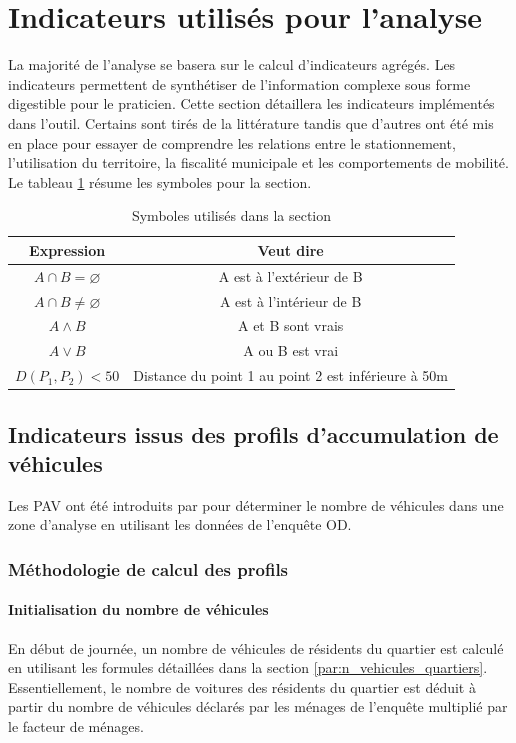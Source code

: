 \section{Indicateurs utilisés pour l'analyse} \label{sec:meth_analyse}
    La majorité de l'analyse se basera sur le calcul d'indicateurs agrégés. Les indicateurs permettent de synthétiser de l'information complexe sous forme digestible pour le praticien. Cette section détaillera les indicateurs implémentés dans l'outil. Certains sont tirés de la littérature tandis que d'autres ont été mis en place pour essayer de comprendre les relations entre le stationnement, l'utilisation du territoire, la fiscalité municipale et les comportements de mobilité. Le tableau \ref{tab:symbols-indicators-section} résume les symboles pour la section.
    \begin{table}[H]
        \centering
        \caption{Symboles utilisés dans la section}
        \label{tab:symbols-indicators-section}
        \begin{tabular}{c|c}
            \hline
            Expression & Veut dire \\ \hline
            $A \cap B = \varnothing$ & A est à l'extérieur de B \\
            $A \cap B \neq \varnothing$ & A est à l'intérieur de B \\
            $A \wedge B$ & A et B sont vrais\\
            $A \lor B$ & A ou B est vrai\\ 
            $D(P_1,P_2)<50$ & Distance du point 1 au point 2 est inférieure à 50m\\
            \hline
        \end{tabular}
        
    \end{table}
    \subsection{Indicateurs issus des profils d'accumulation de véhicules} \label{ssec:pav-calcs}
        Les \ac{PAV} ont été introduits par \textcite{morency_characterizing_2008} pour déterminer le nombre de véhicules dans une zone d'analyse en utilisant les données de l'enquête OD. 
            \subsubsection{Méthodologie de calcul des profils}
                \paragraph{Initialisation du nombre de véhicules} En début de journée, un nombre de véhicules de résidents du quartier est calculé en utilisant les formules détaillées dans la section \ref{par:n_vehicules_quartiers}. Essentiellement, le nombre de voitures des résidents du quartier est déduit à partir du nombre de véhicules déclarés par les ménages de l'enquête multiplié par le facteur de ménages.
